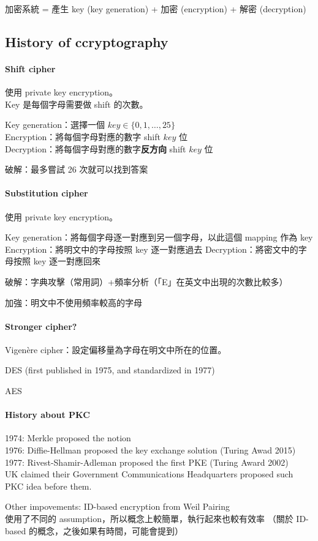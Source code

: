 加密系統 = 產生 key (key generation) + 加密 (encryption) + 解密 (decryption)


\subsection{History of ccryptography}

\paragraph{Shift cipher}

使用 private key encryption。 \\
Key 是每個字母需要做 shift 的次數。

Key generation：選擇一個  \(key \in \{0, 1, \ldots, 25\}\) \\
Encryption：將每個字母對應的數字 shift \(key\) 位 \\
Decryption：將每個字母對應的數字\textbf{反方向} shift \(key\) 位

破解：最多嘗試 26 次就可以找到答案


\paragraph{Substitution cipher}

使用 private key encryption。

Key generation：將每個字母逐一對應到另一個字母，以此這個 mapping 作為 key
Encryption：將明文中的字母按照 key 逐一對應過去
Decryption：將密文中的字母按照 key 逐一對應回來

破解：字典攻擊（常用詞）+頻率分析（「E」在英文中出現的次數比較多）

加強：明文中不使用頻率較高的字母


\paragraph{Stronger cipher?}

Vigenère cipher：設定偏移量為字母在明文中所在的位置。

DES (first published in 1975, and standardized in 1977)

AES


\paragraph{History about PKC}

1974: Merkle proposed the notion \\
1976: Diffie-Hellman proposed the key exchange solution (Turing Awad 2015) \\
1977: Rivest-Shamir-Adleman proposed the first PKE (Turing Award 2002) \\
UK claimed their Government Communications Headquarters proposed such PKC idea before them.

Other impovements: ID-based encryption from Weil Pairing\\
使用了不同的 assumption，所以概念上較簡單，執行起來也較有效率
（關於 ID-based 的概念，之後如果有時間，可能會提到）
